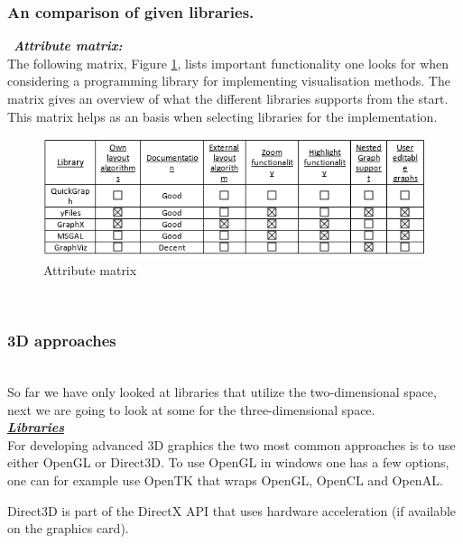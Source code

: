 \documentclass[a4paper,11pt]{kth-mag}
\begin{document}
\begin{appendices}
\subsubsection{An comparison of given libraries.}
\
\textbf{\textit{Attribute matrix:}}\
\newline
\\
The following matrix, Figure \ref{fig:libAttributeMatrix:appendix}, lists important functionality one looks for when considering a programming library for implementing visualisation methods. The matrix gives an overview of what the 
different libraries supports from the start. This matrix helps as an basis when selecting libraries for the implementation.\\

\begin{figure}[!htbp]
	\centering
	\includegraphics[scale=1.0]{LibraryAttributeMatrix}
	\caption{Attribute matrix}
	\label{fig:libAttributeMatrix:appendix}
\end{figure}
\\
\subsubsection{3D approaches}\\
So far we have only looked at libraries that utilize the two-dimensional space, next we are going to look at some for the three-dimensional space.
\\
\newline
\textbf{\textit{\underline{Libraries}}}\\
\newline
For developing advanced 3D graphics the two most common approaches is to use either OpenGL\cite{website:OpenGL} or Direct3D\cite{website:Direct3D}. To use OpenGL in windows one has a few options, one can for example use
 OpenTK that wraps OpenGL, OpenCL\cite{website:OpenCL} and OpenAL\cite{website:OpenAL}. 

Direct3D is part of the DirectX API that uses hardware acceleration (if available on the graphics card).
\\

\end{appendices}
\end{document}
